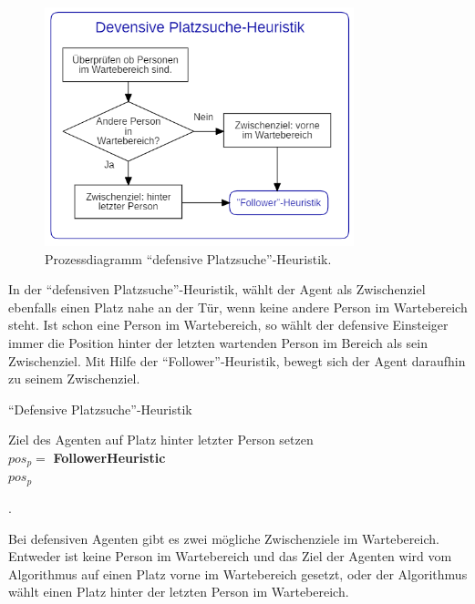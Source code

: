 \begin{figure}[H]
	\centering
		\includegraphics[width=0.8\textwidth]{pictures/model/algorithm/boarding/defensive_boarding/defensive_space_find_heuristic.png}
	\caption{Prozessdiagramm "`defensive Platzsuche"'-Heuristik.}
	\label{fig:DPH}
\end{figure}
In der "`defensiven Platzsuche"'-Heuristik, wählt der Agent als Zwischenziel ebenfalls einen Platz nahe an der Tür, wenn keine andere Person im Wartebereich steht. Ist schon eine Person im Wartebereich, so wählt der defensive Einsteiger immer die Position hinter der letzten wartenden Person im Bereich als sein Zwischenziel. Mit Hilfe der "`Follower"'-Heuristik, bewegt sich der Agent daraufhin zu seinem Zwischenziel. \\
\begin{algorithm} [H]
	\caption{"`Defensive Platzsuche"'-Heuristik}
	
	\DefensiveSpaceFindHeuristic{} {
		 {
			Ziel des Agenten auf Platz hinter letzter Person setzen\\
		} 
		$pos_p = $ \textbf{FollowerHeuristic} \\
		\Return $pos_p$
	}
\end{algorithm}.

Bei defensiven Agenten gibt es zwei mögliche Zwischenziele im Wartebereich. Entweder ist keine Person im Wartebereich und das Ziel der Agenten wird vom Algorithmus auf einen Platz vorne im Wartebereich gesetzt, oder der Algorithmus wählt einen Platz hinter der letzten Person im Wartebereich.
